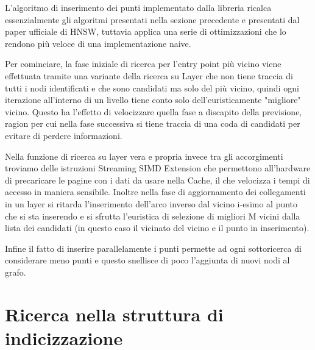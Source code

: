 L'algoritmo di inserimento dei punti implementato dalla libreria ricalca essenzialmente gli algoritmi presentati nella sezione precedente e presentati dal paper ufficiale di HNSW, tuttavia applica una serie di ottimizzazioni che lo rendono pi\`u veloce di una implementazione naive.

Per cominciare, la fase iniziale di ricerca per l'entry point pi\`u vicino viene effettuata tramite una variante della ricerca su Layer che non tiene traccia di tutti i nodi identificati e che sono candidati ma solo del pi\`u vicino, quindi ogni iterazione all'interno di un livello tiene conto solo dell'euristicamente "migliore" vicino.
Questo ha l'effetto di velocizzare quella fase a discapito della previsione, ragion per cui nella fase successiva si tiene traccia di una coda di candidati per evitare di perdere informazioni.

Nella funzione di ricerca su layer vera e propria invece tra gli accorgimenti troviamo delle istruzioni Streaming SIMD Extension che permettono all'hardware di precaricare le pagine con i dati da usare nella Cache, il che velocizza i tempi di accesso in maniera sensibile.
Inoltre nella fase di aggiornamento dei collegamenti in un layer si ritarda l'inserimento dell'arco inverso dal vicino i-esimo al punto che si sta inserendo e si sfrutta l'euristica di selezione di migliori M vicini dalla lista dei candidati (in questo caso il vicinato del vicino e il punto in inserimento).

Infine il fatto di inserire parallelamente i punti permette ad ogni sottoricerca di considerare meno punti e questo snellisce di poco l'aggiunta di nuovi nodi al grafo.

\section{Ricerca nella struttura di indicizzazione}

